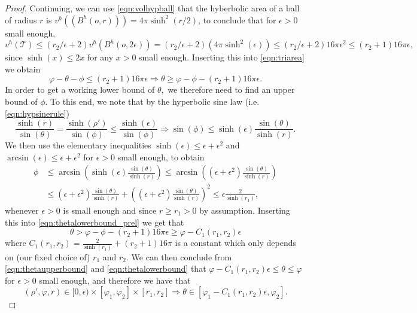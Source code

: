 \documentclass[a4paper,12pt]{article}
\newcommand{\CT}{{\mathcal{T}}}
\begin{document}
\begin{proof}
Continuing, we can use \eqref{eqn:volhypball} that the hyberbolic area 
of a ball of radius $r$ is
$v^h((B^h(o,r)))=4 \pi \sinh^2(r/2)$,
to conclude that for $\epsilon>0$ small enough,
\[
v^h(\CT) \leq (r_2/\epsilon+2)v^h(B^h(o,2\epsilon))
=(r_2/\epsilon+2)(4 \pi \sinh^2(\epsilon)) 
\leq (r_2/\epsilon+2)16\pi \epsilon^2
\leq (r_2+1)16\pi \epsilon,  
\]
since $\sinh(x)\leq 2x$ for any $x>0$ small enough.
Inserting this into \eqref{eqn:triarea} we obtain
\begin{equation} \label{eqn:thetalowerbound_prel}
\varphi-\theta-\phi \leq (r_2+1)16\pi  \epsilon
\Rightarrow \theta\geq \varphi-\phi-(r_2+1)16\pi  \epsilon.    
\end{equation}
In order to get a working lower bound of $\theta,$ we therefore need to find an upper 
bound of $\phi.$ To this end, we note that by the hyperbolic sine law (i.e. \eqref{eqn:hypsinerule})
\[
\frac{\sinh(r)}{\sin(\theta)}=\frac{\sinh(\rho')}{\sin (\phi)}
\leq \frac{\sinh(\epsilon)}{\sin (\phi)}
\Rightarrow \sin(\phi)\leq \sinh(\epsilon) \frac{\sin(\theta)}{\sinh(r)}.
\]
We then use the elementary inequalities $\sinh(\epsilon)\leq \epsilon+\epsilon^2$
and $\arcsin(\epsilon)\leq \epsilon+\epsilon^2$
for $\epsilon>0$ small enough, to obtain
\begin{align} \label{eqn:phiuppest}
 \phi & \leq \arcsin\left(\sinh(\epsilon)\frac{\sin(\theta)}{\sinh(r)}\right)   
\leq \arcsin\left((\epsilon+\epsilon^2)
\frac{\sin(\theta)}{\sinh(r)}\right)\\
& \leq (\epsilon+\epsilon^2)\frac{\sin(\theta)}{\sinh(r)}
+\left((\epsilon+\epsilon^2)\frac{\sin(\theta)}{\sinh(r)}\right)^2
\leq \epsilon\frac{2}{\sinh(r_1)}, \nonumber
\end{align}
whenever $\epsilon>0$ is small enough and since $r\geq r_1>0$ by assumption. 
Inserting this into \eqref{eqn:thetalowerbound_prel} we get that
\begin{equation} \label{eqn:thetalowerbound}
\theta>\varphi-\phi-(r_2+1)16\pi \epsilon \geq \varphi-C_1(r_1,r_2) \epsilon  
\end{equation}
where $C_1(r_1,r_2)=\frac{2}{\sinh(r_1)}+(r_2+1)16\pi$ is a constant which only depends on 
(our fixed choice of) $r_1$ and $r_2.$
We can then conclude from \eqref{eqn:thetaupperbound} and \eqref{eqn:thetalowerbound} that 
$\varphi-C_1(r_1,r_2) \epsilon \leq \theta \leq \varphi$ for $\epsilon>0$ small enough,
and therefore we have that
\begin{equation} \label{eqn:thetaimpliedbounds}
(\rho',\varphi,r)\in[0,\epsilon) \times [\varphi_1,\varphi_2]
\times [r_1,r_2]  
\Rightarrow \theta\in[\varphi_1-C_1(r_1,r_2)\epsilon,\varphi_2].  
\end{equation}


\end{proof}
\end{document}
